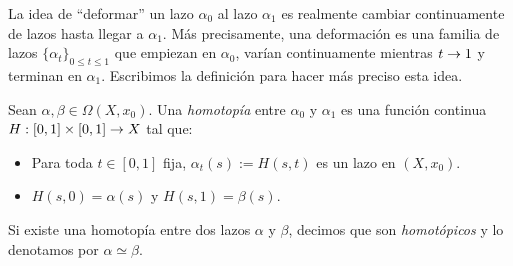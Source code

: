 \documentclass[../../topologia_algebraica]{subfiles}
\begin{document}
La idea de ``deformar'' un lazo $\alpha_0$ al lazo $\alpha_1$ es realmente cambiar continuamente
de lazos hasta llegar a $\alpha_1$. M\'as precisamente, una deformaci\'on es una familia de lazos
$\{\alpha_t\}_{0\leq t\leq 1}$ que empiezan en $\alpha_0$, var\'ian continuamente mientras $t\rightarrow 1$
y terminan en $\alpha_1$. Escribimos la definici\'on para hacer m\'as preciso esta idea.

\begin{defin}
  Sean $\alpha,\beta\in\Omega(X,x_0)$. Una \emph{homotop\'ia} entre $\alpha_0$ y $\alpha_1$
  es una funci\'on continua $H:[0,1]\times[0,1]\rightarrow X$ tal que:
  \begin{itemize}
  \item Para toda $t\in[0,1]$ fija, $\alpha_{t}(s):=H(s,t)$ es un lazo en $(X,x_0)$.
  \item $H(s,0)=\alpha(s)$ y $H(s,1)=\beta(s)$.
  \end{itemize}
  Si existe una homotop\'ia entre dos lazos $\alpha$ y $\beta$, decimos que son
  \emph{homot\'opicos} y lo denotamos por $\alpha\simeq\beta$.
\end{defin}
\end{document}

